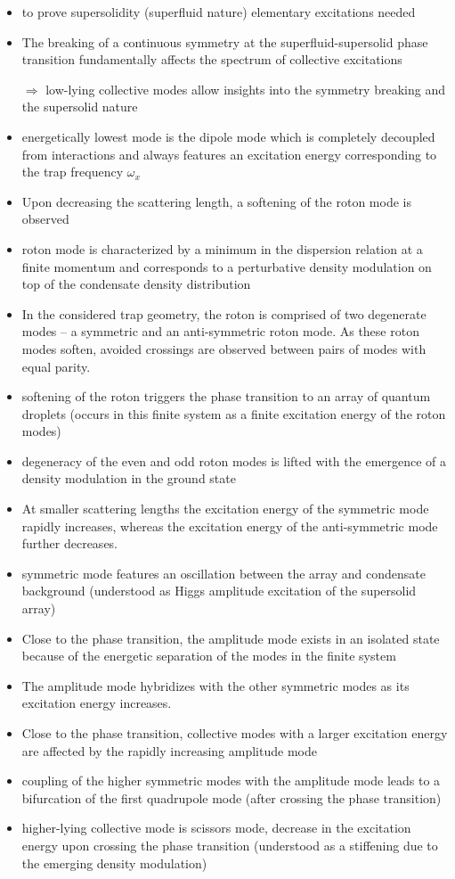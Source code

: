  
\begin{itemize}
    \item to prove supersolidity (superfluid nature) elementary excitations needed
    \item The breaking of a continuous symmetry at the superfluid-supersolid phase transition fundamentally
affects the spectrum of collective excitations
    \item[$\Rightarrow$] low-lying collective modes allow insights into the symmetry breaking and the supersolid nature
    \item energetically lowest mode is the dipole mode which is completely decoupled from interactions and always features an excitation energy corresponding to the trap frequency $\omega_{x}$
    \item Upon decreasing the scattering length, a softening of the roton
mode is observed
    \item roton mode is characterized by a minimum in the dispersion relation at a finite momentum and corresponds to a perturbative density modulation on top of the condensate density distribution
    \item In the considered trap geometry, the roton is comprised of two degenerate
modes – a symmetric and an anti-symmetric roton mode. As these roton modes soften,
avoided crossings are observed between pairs of modes with equal parity.
    \item softening of the roton triggers the phase transition to an array of quantum
droplets (occurs in this finite system as a finite excitation energy of the roton modes)
    \item degeneracy of the even and odd roton modes is lifted with the emergence of a density modulation in the ground state
    \item At smaller scattering lengths the excitation energy of the symmetric mode rapidly increases, whereas the excitation energy of the anti-symmetric mode further decreases.
    \item symmetric mode features an oscillation between the array and condensate background (understood as Higgs amplitude excitation of the supersolid array)
    \item Close to the phase transition, the amplitude mode exists in an isolated state because of the
energetic separation of the modes in the finite system
    \item The amplitude mode hybridizes with the other symmetric modes as its excitation energy increases.
    \item Close to the phase transition, collective modes with a larger excitation energy are affected by the rapidly increasing amplitude mode
    \item coupling of the higher symmetric modes with the amplitude mode leads to a bifurcation of the first quadrupole mode (after crossing the phase transition)
    \item higher-lying collective mode is scissors mode, decrease in the excitation energy upon crossing the phase transition (understood as a stiffening due to the emerging density modulation)
\end{itemize}

